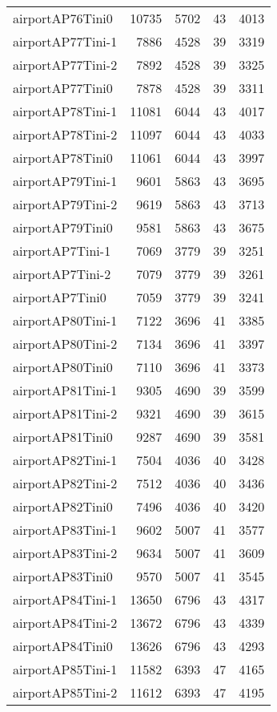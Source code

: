 \documentclass[../../../thesis.tex]{subfiles}
\begin{document}
\begin{longtable}{lrrrr}
airportAP76Tini0 & 10735 & 5702 & 43 & 4013 \\
airportAP77Tini-1 & 7886 & 4528 & 39 & 3319 \\
airportAP77Tini-2 & 7892 & 4528 & 39 & 3325 \\
airportAP77Tini0 & 7878 & 4528 & 39 & 3311 \\
airportAP78Tini-1 & 11081 & 6044 & 43 & 4017 \\
airportAP78Tini-2 & 11097 & 6044 & 43 & 4033 \\
airportAP78Tini0 & 11061 & 6044 & 43 & 3997 \\
airportAP79Tini-1 & 9601 & 5863 & 43 & 3695 \\
airportAP79Tini-2 & 9619 & 5863 & 43 & 3713 \\
airportAP79Tini0 & 9581 & 5863 & 43 & 3675 \\
airportAP7Tini-1 & 7069 & 3779 & 39 & 3251 \\
airportAP7Tini-2 & 7079 & 3779 & 39 & 3261 \\
airportAP7Tini0 & 7059 & 3779 & 39 & 3241 \\
airportAP80Tini-1 & 7122 & 3696 & 41 & 3385 \\
airportAP80Tini-2 & 7134 & 3696 & 41 & 3397 \\
airportAP80Tini0 & 7110 & 3696 & 41 & 3373 \\
airportAP81Tini-1 & 9305 & 4690 & 39 & 3599 \\
airportAP81Tini-2 & 9321 & 4690 & 39 & 3615 \\
airportAP81Tini0 & 9287 & 4690 & 39 & 3581 \\
airportAP82Tini-1 & 7504 & 4036 & 40 & 3428 \\
airportAP82Tini-2 & 7512 & 4036 & 40 & 3436 \\
airportAP82Tini0 & 7496 & 4036 & 40 & 3420 \\
airportAP83Tini-1 & 9602 & 5007 & 41 & 3577 \\
airportAP83Tini-2 & 9634 & 5007 & 41 & 3609 \\
airportAP83Tini0 & 9570 & 5007 & 41 & 3545 \\
airportAP84Tini-1 & 13650 & 6796 & 43 & 4317 \\
airportAP84Tini-2 & 13672 & 6796 & 43 & 4339 \\
airportAP84Tini0 & 13626 & 6796 & 43 & 4293 \\
airportAP85Tini-1 & 11582 & 6393 & 47 & 4165 \\
airportAP85Tini-2 & 11612 & 6393 & 47 & 4195 \\

\end{longtable}
\end{document}
